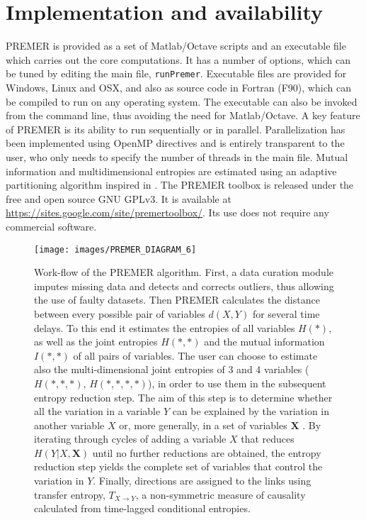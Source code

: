 \documentclass{llncs}
\begin{document}
\section{Implementation and availability}

PREMER is provided as a set of Matlab/Octave scripts and an executable file which carries out the core computations.
 It has a number of options, which can be tuned by editing the main file, \texttt{runPremer}. Executable files are provided for Windows, Linux and OSX, and also as source code in Fortran (F90), which can be compiled to run on any operating system. 
The executable can also be invoked from the command line, thus avoiding the need for Matlab/Octave.
A key feature of PREMER is its ability to run sequentially or in parallel. Parallelization has been implemented using OpenMP directives \cite{dagum1998openmp} and is entirely transparent to the user, who only needs to specify the number of threads in the main file. 
Mutual information and multidimensional entropies are estimated using an adaptive partitioning algorithm inspired in \cite{Cellucci2005}.
The PREMER toolbox is released under the free and open source GNU GPLv3. It is available at \url{https://sites.google.com/site/premertoolbox/}. Its use does not require any commercial software.



\begin{figure}[t]
	\begin{center}
		\texttt{[image: images/PREMER\_DIAGRAM\_6]}
		\caption{Work-flow of the PREMER algorithm. First, a data curation module imputes missing data \cite{folch2015enabling} and detects and corrects outliers, thus allowing the use of faulty datasets. 
			Then PREMER calculates the distance between every possible pair of variables $d(X,Y)$ for several time delays. To this end it estimates the entropies of all variables $H(*)$, as well as the joint entropies $H(*,*)$ and the mutual information $I(*,*)$ of all pairs of variables.
			The user can choose to estimate also the multi-dimensional joint entropies of 3 and 4 variables ($H(*,*,*)$, $H(*,*,*,*)$), in order to use them in the subsequent entropy reduction step. The aim of this step is to determine whether all the variation in a variable $Y$ can be explained by the variation in another variable $X$ or, more generally, in a set of variables $\textbf{X}$ \cite{Samoilov2001}. By iterating through cycles of adding a variable $X$ that reduces $H(Y|X,\textbf{X})$ until no further reductions are obtained, the entropy reduction step yields the complete set of variables that control the variation in $Y$.
			Finally, directions are assigned to the links using transfer entropy, $T_{X\rightarrow Y}$, a non-symmetric measure of causality \cite{schreiber2000measuring} calculated from time-lagged conditional entropies.} 
		\label{diagram} 
	\end{center}	
\end{figure} 
\end{document}
